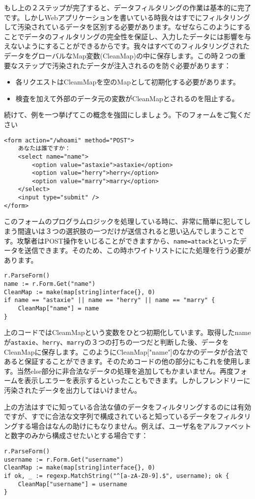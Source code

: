 もし上の２ステップが完了すると、データフィルタリングの作業は基本的に完了です。しかしWebアプリケーションを書いている時我々はすでにフィルタリングして汚染されているデータを区別する必要があります。なぜならこのようにすることでデータのフィルタリングの完全性を保証し、入力したデータには影響を与えないようにすることができるからです。我々はすべてのフィルタリングされたデータをグローバルなMap変数(CleanMap)の中に保存します。この時２つの重要なステップで汚染されたデータが注入されるのを防ぐ必要があります：

\begin{itemize}
  \item 各リクエストはCleamMapを空のMapとして初期化する必要があります。
  \item 検査を加えて外部のデータ元の変数がCleanMapとされるのを阻止する。
\end{itemize}

続けて、例を一つ挙げてこの概念を強固にしましょう。下のフォームをご覧ください

\begin{lstlisting}[numbers=none]
<form action="/whoami" method="POST">
    あなたは誰ですか：
    <select name="name">
        <option value="astaxie">astaxie</option>
        <option value="herry">herry</option>
        <option value="marry">marry</option>
    </select>
    <input type="submit" />
</form>
\end{lstlisting}

このフォームのプログラムロジックを処理している時に、非常に簡単に犯してしまう間違いは３つの選択肢の一つだけが送信されると思い込んでしまうことです。攻撃者はPOST操作をいじることができますから、\texttt{name=attack}といったデータを送信できます。そのため、この時ホワイトリストににた処理を行う必要があります。

\begin{lstlisting}[numbers=none]
r.ParseForm()
name := r.Form.Get("name")
CleanMap := make(map[string]interface{}, 0)
if name == "astaxie" || name == "herry" || name == "marry" {
    CleanMap["name"] = name
}
\end{lstlisting}

上のコードではCleamMapという変数をひとつ初期化しています。取得したnameが\texttt{astaxie}、\texttt{herry}、\texttt{marry}の３つの打ちの一つだと判断した後、データをCleanMapに保存します。このようにCleanMap["name"]のなかのデータが合法であると保証することができます。そのためコードの他の部分にもこれを使用します。当然else部分に非合法なデータの処理を追加してもかまいません。再度フォームを表示しエラーを表示するといったこともできます。しかしフレンドリーに汚染されたデータを出力してはいけません。

上の方法はすでに知っている合法な値のデータをフィルタリングするのには有効ですが、すでに合法な文字列で構成されていると知っているデータをフィルタリングする場合はなんの助けにもなりません。例えば、ユーザ名をアルファベットと数字のみから構成させたいとする場合です：

\begin{lstlisting}[numbers=none]
r.ParseForm()
username := r.Form.Get("username")
CleanMap := make(map[string]interface{}, 0)
if ok, _ := regexp.MatchString("^[a-zA-Z0-9].$", username); ok {
    CleanMap["username"] = username
}
\end{lstlisting}

